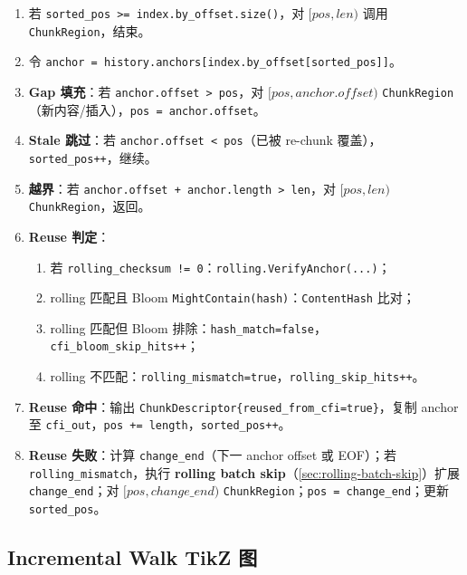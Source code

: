\begin{enumerate}[label=\textbf{W-\arabic*.}]
  \item 若 \texttt{sorted\_pos >= index.by\_offset.size()}，对 $[\mathit{pos}, len)$ 调用 \texttt{ChunkRegion}，结束。
  \item 令 \texttt{anchor = history.anchors[index.by\_offset[sorted\_pos]]}。
  \item \textbf{Gap 填充}：若 \texttt{anchor.offset > pos}，对 $[\mathit{pos}, \mathit{anchor.offset})$ \texttt{ChunkRegion}（新内容/插入），\texttt{pos = anchor.offset}。
  \item \textbf{Stale 跳过}：若 \texttt{anchor.offset < pos}（已被 re-chunk 覆盖），\texttt{sorted\_pos++}，继续。
  \item \textbf{越界}：若 \texttt{anchor.offset + anchor.length > len}，对 $[\mathit{pos}, len)$ \texttt{ChunkRegion}，返回。
  \item \textbf{Reuse 判定}：
  \begin{enumerate}[label*=\alph*.]
    \item 若 \texttt{rolling\_checksum != 0}：\texttt{rolling.VerifyAnchor(...)}；
    \item rolling 匹配且 Bloom \texttt{MightContain(hash)}：\texttt{ContentHash} 比对；
    \item rolling 匹配但 Bloom 排除：\texttt{hash\_match=false}，\texttt{cfi\_bloom\_skip\_hits++}；
    \item rolling 不匹配：\texttt{rolling\_mismatch=true}，\texttt{rolling\_skip\_hits++}。
  \end{enumerate}
  \item \textbf{Reuse 命中}：输出 \texttt{ChunkDescriptor\{reused\_from\_cfi=true\}}，复制 anchor 至 \texttt{cfi\_out}，\texttt{pos += length}，\texttt{sorted\_pos++}。
  \item \textbf{Reuse 失败}：计算 \texttt{change\_end}（下一 anchor offset 或 EOF）；若 \texttt{rolling\_mismatch}，执行 \textbf{rolling batch skip}（\cref{sec:rolling-batch-skip}）扩展 \texttt{change\_end}；对 $[\mathit{pos}, \mathit{change\_end})$ \texttt{ChunkRegion}；\texttt{pos = change\_end}；更新 \texttt{sorted\_pos}。
\end{enumerate}

\subsection{Incremental Walk TikZ 图}

